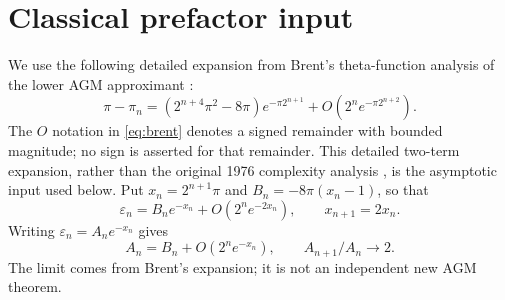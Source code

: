 \documentclass[11pt]{article}
\theoremstyle{definition}\newtheorem{remark}{Remark}\newtheorem{observation}{Numerical Observation}
\begin{document}
\section{Classical prefactor input}
We use the following detailed expansion from Brent's theta-function analysis of the lower AGM approximant \cite{brent2020}:
\begin{equation}\label{eq:brent}
\pi-\pi_n=(2^{n+4}\pi^2-8\pi)e^{-\pi 2^{n+1}}+O(2^n e^{-\pi 2^{n+2}}).
\end{equation}
The $O$ notation in \eqref{eq:brent} denotes a signed remainder with bounded magnitude; no sign is asserted for that remainder. This detailed two-term expansion, rather than the original 1976 complexity analysis \cite{brent1976}, is the asymptotic input used below.
Put $x_n=2^{n+1}\pi$ and $B_n=-8\pi(x_n-1)$, so that
\begin{equation}\label{eq:error}
\varepsilon_n=B_n e^{-x_n}+O(2^n e^{-2x_n}),\qquad x_{n+1}=2x_n.
\end{equation}
Writing $\varepsilon_n=A_n e^{-x_n}$ gives
\[
A_n=B_n+O(2^n e^{-x_n}),\qquad A_{n+1}/A_n\longrightarrow2.
\]
The limit comes from Brent's expansion; it is not an independent new AGM theorem.
\end{document}
